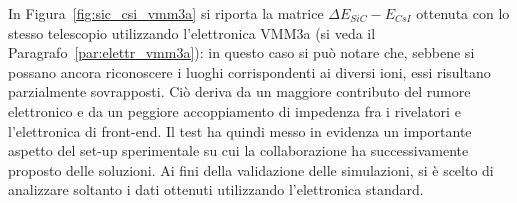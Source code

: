 


In Figura~\ref{fig:sic_csi_vmm3a} si riporta la  matrice $\Delta E_{SiC} - E_{CsI}$ ottenuta con lo stesso telescopio utilizzando l'elettronica VMM3a (si veda il Paragrafo~\ref{par:elettr_vmm3a}): in questo caso si può notare che, sebbene si possano ancora riconoscere i luoghi corrispondenti ai diversi ioni, essi risultano parzialmente sovrapposti.
Ciò deriva da un maggiore contributo del rumore elettronico e da un peggiore accoppiamento di impedenza fra i rivelatori e l'elettronica di front-end.
Il test ha quindi messo in evidenza un importante aspetto del set-up sperimentale su cui la collaborazione ha successivamente proposto delle soluzioni.
Ai fini della validazione delle simulazioni, si è scelto di analizzare soltanto i dati ottenuti utilizzando l'elettronica standard.

